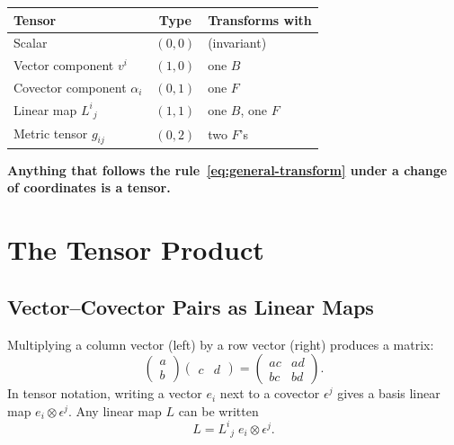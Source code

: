 \documentclass[12pt, a4paper]{report}
\theoremstyle{definition}
\theoremstyle{plain}
\theoremstyle{remark}
\begin{document}
\begin{center}
\renewcommand{\arraystretch}{1.4}
\begin{tabular}{lcl}
    \toprule
    \textbf{Tensor} & \textbf{Type} & \textbf{Transforms with} \\
    \midrule
    Scalar           & $(0,0)$ & (invariant) \\
    Vector component $v^{i}$ & $(1,0)$ & one $B$ \\
    Covector component $\alpha_i$ & $(0,1)$ & one $F$ \\
    Linear map $L^{i}{}_{j}$ & $(1,1)$ & one $B$, one $F$ \\
    Metric tensor $g_{ij}$   & $(0,2)$ & two $F$'s \\
    \bottomrule
\end{tabular}
\end{center}

\textbf{Anything that follows the rule~\eqref{eq:general-transform} under a change
of coordinates is a tensor.}

\chapter{The Tensor Product}\label{ch:tensor-product}

\section{Vector--Covector Pairs as Linear Maps}\label{sec:vec-cov-pairs}

Multiplying a column vector (left) by a row vector (right) produces a matrix:
\[
    \begin{pmatrix} a \\ b \end{pmatrix}
    \begin{pmatrix} c & d \end{pmatrix}
    = \begin{pmatrix} ac & ad \\ bc & bd \end{pmatrix}.
\]
In tensor notation, writing a vector $e_i$ next to a covector $\epsilon^{j}$ gives
a basis linear map $e_i \otimes \epsilon^{j}$.  Any linear map $L$ can be written
\begin{equation}\label{eq:L-tensor-expand}
    L = L^{i}{}_{j}\; e_i \otimes \epsilon^{j}.
\end{equation}
\end{document}
